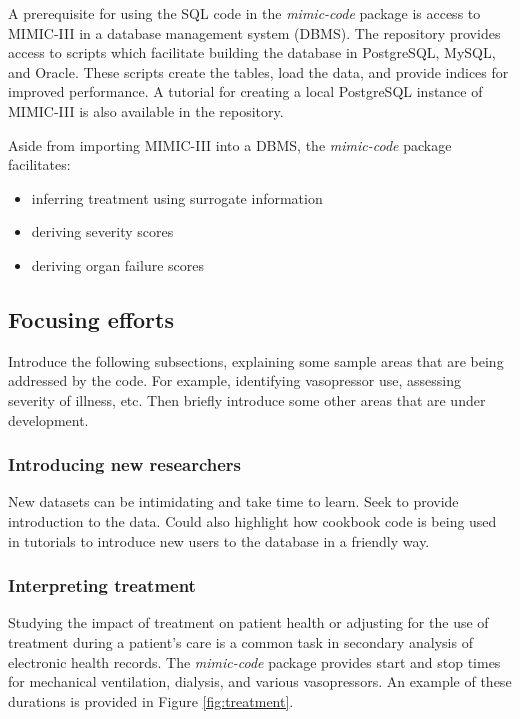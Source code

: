 \documentclass{bioinfo}
\begin{document}
\begin{methods}

A prerequisite for using the SQL code in the \emph{mimic-code} package is access to MIMIC-III in a database management system (DBMS). The repository provides access to scripts which facilitate building the database in PostgreSQL, MySQL, and Oracle. These scripts create the tables, load the data, and provide indices for improved performance. A tutorial for creating a local PostgreSQL instance of MIMIC-III is also available in the repository.

Aside from importing MIMIC-III into a DBMS, the \emph{mimic-code} package facilitates:

\begin{itemize}
\item inferring treatment using surrogate information
\item deriving severity scores
\item deriving organ failure scores
\end{itemize}

\subsection{Focusing efforts}

Introduce the following subsections, explaining some sample areas that are being addressed by the code. For example, identifying vasopressor use, assessing severity of illness, etc. Then briefly introduce some other areas that are under development. 

\subsubsection{Introducing new researchers}

New datasets can be intimidating and take time to learn. Seek to provide introduction to the data. Could also highlight how cookbook code is being used in tutorials to introduce new users to the database in a friendly way.

\subsubsection{Interpreting treatment}


Studying the impact of treatment on patient health or adjusting for the use of treatment during a patient's care is a common task in secondary analysis of electronic health records. The \emph{mimic-code} package provides start and stop times for mechanical ventilation, dialysis, and various vasopressors. An example of these durations is provided in Figure \ref{fig:treatment}.


\end{methods}
\end{document}
